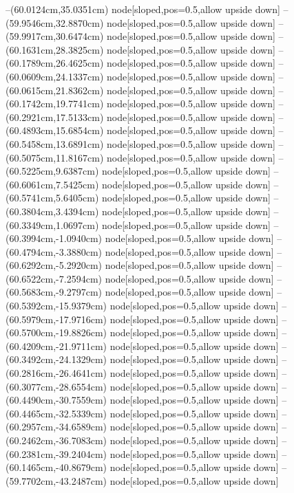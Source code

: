 --(60.0124cm,35.0351cm) node[sloped,pos=0.5,allow upside down]{\ArrowIn}
--(59.9546cm,32.8870cm) node[sloped,pos=0.5,allow upside down]{\ArrowIn}
--(59.9917cm,30.6474cm) node[sloped,pos=0.5,allow upside down]{\ArrowIn}
--(60.1631cm,28.3825cm) node[sloped,pos=0.5,allow upside down]{\ArrowIn}
--(60.1789cm,26.4625cm) node[sloped,pos=0.5,allow upside down]{\ArrowIn}
--(60.0609cm,24.1337cm) node[sloped,pos=0.5,allow upside down]{\ArrowIn}
--(60.0615cm,21.8362cm) node[sloped,pos=0.5,allow upside down]{\ArrowIn}
--(60.1742cm,19.7741cm) node[sloped,pos=0.5,allow upside down]{\ArrowIn}
--(60.2921cm,17.5133cm) node[sloped,pos=0.5,allow upside down]{\ArrowIn}
--(60.4893cm,15.6854cm) node[sloped,pos=0.5,allow upside down]{\ArrowIn}
--(60.5458cm,13.6891cm) node[sloped,pos=0.5,allow upside down]{\ArrowIn}
--(60.5075cm,11.8167cm) node[sloped,pos=0.5,allow upside down]{\ArrowIn}
--(60.5225cm,9.6387cm) node[sloped,pos=0.5,allow upside down]{\ArrowIn}
--(60.6061cm,7.5425cm) node[sloped,pos=0.5,allow upside down]{\ArrowIn}
--(60.5741cm,5.6405cm) node[sloped,pos=0.5,allow upside down]{\ArrowIn}
--(60.3804cm,3.4394cm) node[sloped,pos=0.5,allow upside down]{\ArrowIn}
--(60.3349cm,1.0697cm) node[sloped,pos=0.5,allow upside down]{\ArrowIn}
--(60.3994cm,-1.0940cm) node[sloped,pos=0.5,allow upside down]{\ArrowIn}
--(60.4794cm,-3.3880cm) node[sloped,pos=0.5,allow upside down]{\ArrowIn}
--(60.6292cm,-5.2920cm) node[sloped,pos=0.5,allow upside down]{\ArrowIn}
--(60.6522cm,-7.2594cm) node[sloped,pos=0.5,allow upside down]{\ArrowIn}
--(60.5683cm,-9.2797cm) node[sloped,pos=0.5,allow upside down]{\ArrowIn}
--(60.5392cm,-15.9379cm) node[sloped,pos=0.5,allow upside down]{\ArrowIn}
--(60.5979cm,-17.9716cm) node[sloped,pos=0.5,allow upside down]{\ArrowIn}
--(60.5700cm,-19.8826cm) node[sloped,pos=0.5,allow upside down]{\ArrowIn}
--(60.4209cm,-21.9711cm) node[sloped,pos=0.5,allow upside down]{\ArrowIn}
--(60.3492cm,-24.1329cm) node[sloped,pos=0.5,allow upside down]{\ArrowIn}
--(60.2816cm,-26.4641cm) node[sloped,pos=0.5,allow upside down]{\ArrowIn}
--(60.3077cm,-28.6554cm) node[sloped,pos=0.5,allow upside down]{\ArrowIn}
--(60.4490cm,-30.7559cm) node[sloped,pos=0.5,allow upside down]{\ArrowIn}
--(60.4465cm,-32.5339cm) node[sloped,pos=0.5,allow upside down]{\ArrowIn}
--(60.2957cm,-34.6589cm) node[sloped,pos=0.5,allow upside down]{\ArrowIn}
--(60.2462cm,-36.7083cm) node[sloped,pos=0.5,allow upside down]{\ArrowIn}
--(60.2381cm,-39.2404cm) node[sloped,pos=0.5,allow upside down]{\ArrowIn}
--(60.1465cm,-40.8679cm) node[sloped,pos=0.5,allow upside down]{\ArrowIn}
--(59.7702cm,-43.2487cm) node[sloped,pos=0.5,allow upside down]{\ArrowIn}

